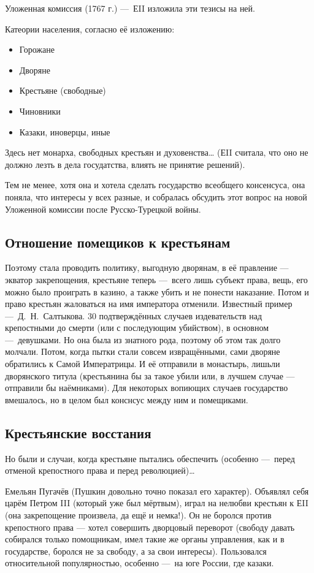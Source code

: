 \documentclass[12pt, a4paper]{article}
\begin{document}
Уложенная комиссия (1767 г.) — ЕII изложила эти тезисы на ней.

Катеории населения, согласно её изложению:
\begin{itemize}
    \item Горожане
    \item Дворяне
    \item Крестьяне (свободные)
    \item Чиновники
    \item Казаки, иноверцы, иные
\end{itemize}

Здесь нет монарха, свободных крестьян и духовенства… (ЕII считала, что оно не должно лезть в дела госудатства, влиять не принятие решений).

Тем не менее, хотя она и хотела сделать государство всеобщего консенсуса, 
она поняла, что интересы у всех разные, и собралась обсудить этот вопрос на новой Уложенной комиссии после Русско-Турецкой войны.


\subsection{Отношение помещиков к крестьянам}

Поэтому стала проводить политику, выгодную дворянам, в её правление — экватор закрепощения, 
крестьяне теперь — всего лишь субъект права, вещь, его можно было проиграть в казино, а также убить и не понести наказание. 
Потом и право крестьян жаловаться на имя императора отменили.
Известный пример — Д. Н. Салтыкова. 30 подтверждённых случаев издевательств над крепостными до смерти (или с последующим убийством), 
в основном — девушками. Но она была из знатного рода, поэтому об этом так долго молчали. 
Потом, когда пытки стали совсем извращёнными, сами дворяне обратились к Самой Императрицы.
И её отправили в монастырь, лишьли дворянского титула (крестьянина бы за такое убили или, в лучшем случае — отправили бы наёмниками).
Для некоторых вопиющих случаев государство вмешалось, но в целом был конснсус между ним и помещиками.


\subsection{Крестьянские восстания}

Но были и случаи, когда крестьяне пытались обеспечить (особенно — перед отменой крепостного права и перед революцией)…

Емельян Пугачёв (Пушкин довольно точно показал его характер). Объявлял себя царём Петром III (который уже был мёртвым),
играл на нелюбви крестьян к ЕII (она закрепощение произвела, да ещё и немка!). 
Он не боролся против крепостного права — хотел совершить дворцовый переворот (свободу давать собирался только помощникам, имел такие же органы управления, как и в государстве, боролся не за свободу, а за свои интересы).
Пользовался относительной популярностью, особенно — на юге России, где казаки.
\end{document}
